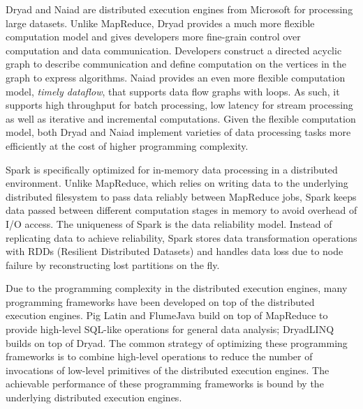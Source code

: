 Dryad \cite{dryad} and Naiad \cite{naiad} are distributed execution engines
from Microsoft for processing
large datasets. Unlike MapReduce, Dryad provides a much more flexible computation
model and gives developers more fine-grain control over computation and data
communication. Developers construct a directed acyclic graph to describe
communication and define computation on the vertices in
the graph to express algorithms. Naiad provides an even more
flexible computation model, \textit{timely dataflow}, that supports data flow
graphs with loops. As such, it supports high throughput for batch processing,
low latency for stream processing as well as iterative and incremental
computations. Given the flexible computation model, both Dryad and Naiad
implement varieties of data processing tasks more efficiently at the cost of
higher programming complexity.

Spark \cite{spark} is specifically
optimized for in-memory data processing in a distributed environment.
Unlike MapReduce, which relies on writing data to the underlying distributed
filesystem to pass data reliably between MapReduce jobs, Spark keeps data
passed between different computation stages in memory to avoid overhead of
I/O access. The uniqueness of Spark is the data reliability model. Instead
of replicating data to achieve reliability, Spark stores data transformation
operations with RDDs (Resilient Distributed Datasets) and handles data loss
due to node failure by reconstructing lost partitions on the fly.

Due to the programming complexity in the distributed execution engines, many
programming frameworks have been developed on top of the distributed execution
engines. Pig Latin \cite{pig} and FlumeJava \cite{flumejava} build on top of
MapReduce to provide high-level SQL-like operations for general data analysis;
DryadLINQ \cite{dryadlinq} builds on top of Dryad. The common strategy of
optimizing these programming frameworks is to combine high-level operations
to reduce the number of invocations of low-level primitives of the distributed
execution engines. The achievable performance of these programming frameworks is
bound by the underlying distributed execution engines.

